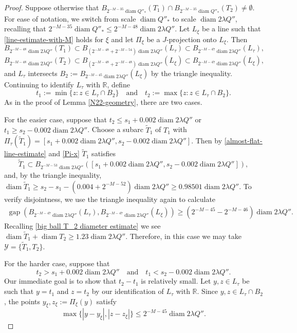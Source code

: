 \documentclass[12pt]{amsart}
\numberwithin{equation}{section}
\theoremstyle{plain}
\theoremstyle{definition}
\newcommand{\diam}{\mathop\mathrm{diam}\nolimits}
\newcommand{\gap}{\mathop\mathrm{gap}\nolimits}
\numberwithin{figure}{section}
\begin{document}
\begin{proof}
Suppose otherwise that $B_{2^{-M-35}\diam Q''_*}(T_1)\cap B_{2^{-M-35}\diam Q''_*}(T_2)\neq \emptyset$. For ease of notation, we switch from scale $\diam Q''_*$ to scale $\diam 2\lambda Q''$, recalling that $2^{-M-35}\diam Q''_* \le 2^{-M-48} \diam 2\lambda Q''$.  Let $L_\xi$ be a line such that \eqref{line-estimate-with-M} holds for $\xi$ and let $\Pi_\xi$ be a $J$-projection onto $L_\xi$. Then $$B_{2^{-M-48}\diam 2\lambda Q''}(T_1) \subset B_{(2^{-M-48} + 2^{-M-54})\diam 2\lambda Q''}(L_{\tau}) \subset B_{2^{-M-47}\diam 2\lambda Q''}(L_{\tau}),$$ $$B_{2^{-M-48}\diam 2\lambda Q''}(T_2) \subset B_{(2^{-M-48}+2^{-M-48})\diam 2\lambda Q''}(L_{\xi}) \subset B_{2^{-M-47}\diam 2\lambda Q''}(L_{\xi}),$$ and $L_{\tau}$ intersects $B_2:=B_{2^{-M-45}\diam 2\lambda Q''}(L_{\xi})$ by the triangle inequality.  Continuing to identify $L_{\tau}$ with $\mathbb{R}$, define $$t_1:=\min\{z:z\in L_\tau \cap B_2\}\quad\text{and}\quad t_2:=\max\{z:z\in L_\tau \cap B_2\}.$$ As in the proof of Lemma \ref{N22-geometry}, there are two cases.

For the easier case, suppose that $t_2\leq s_1+0.002\diam 2\lambda Q''$ or $t_1\geq s_2-0.002\diam 2\lambda Q''$. Choose a subarc $\tilde T_1$ of $T_1$ with $\Pi_\tau(\tilde T_1)=[s_1+0.002\diam 2\lambda Q'',s_2-0.002\diam 2\lambda Q'']$. Then by \eqref{almost-flat-line-estimate} and \eqref{Pi-x} $\tilde T_1$ satisfies $$\tilde T_1 \subset B_{2^{-M-53}\diam 2\lambda Q''}([s_1+0.002\diam 2\lambda Q'',s_2-0.002\diam 2\lambda Q'']),$$ and, by the triangle inequality, $\diam \tilde T_1\geq s_2-s_1 - (0.004 + 2^{-M-52})\diam 2\lambda Q'' \geq 0.98501\diam 2\lambda Q''$.  To verify disjointness, we use the triangle inequality again to calculate \begin{align*}
    \gap(B_{2^{-M-47}\diam 2\lambda Q''}(L_{\tau}), B_{2^{-M-47}\diam 2\lambda Q''}(L_{\xi})) \geq (2^{-M-45} - 2^{-M-46})\diam 2\lambda Q''.
\end{align*} Recalling \eqref{big ball T_2 diameter estimate} we see $\diam \tilde T_1+\diam T_2\geq 1.23\diam 2\lambda Q''$. Therefore, in this case we may take $\mathcal{Y}=\{\tilde T_1,T_2\}$.

For the harder case, suppose that \begin{equation}\label{hard-t} t_2 > s_1+0.002\diam 2\lambda Q''\quad\text{and}\quad t_1<s_2-0.002\diam 2\lambda Q''.\end{equation} Our immediate goal is to show that $t_2-t_1$ is relatively small. Let $y, z \in L_\tau$ be such that $y = t_1$ and $z = t_2$ by our identification of $L_\tau$ with $\mathbb{R}$. Since $y,z \in L_{\tau} \cap B_2$, the points $y_\xi, z_{\xi}:=\Pi_\xi(y)$ satisfy $$\max\{|y-y_\xi|, |z-z_\xi|\} \le  2^{-M-45}\diam 2\lambda Q''.$$


\end{proof}
\end{document}
